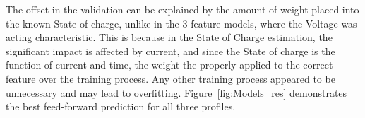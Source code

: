     The offset in the validation can be explained by the amount of weight placed into the known State of charge, unlike in the 3-feature models, where the Voltage was acting characteristic.
    This is because in the State of Charge estimation, the significant impact is affected by current, and since the State of charge is the function of current and time, the weight the properly applied to the correct feature over the training process.
    Any other training process appeared to be unnecessary and may lead to overfitting.
    Figure~\ref{fig:Models_res} demonstrates the best feed-forward prediction for all three profiles.
